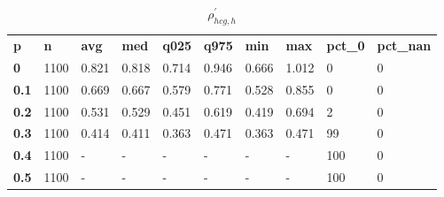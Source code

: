 \begin{table}[h]
 \centering 
\footnotesize
\caption{$\rho_{hcg,h}^\prime $}
\label{tab:alphahcgh}
\begin{tabular}[h]{| l l l l l l l l l l|
    } \hline
\textbf{ p} & \textbf{ n} & \textbf{ avg} & \textbf{ med} & \textbf{ q025} & \textbf{ q975} & \textbf{ min} & \textbf{ max} & \textbf{ pct\_0} & \textbf{ pct\_nan}
           \\
  \textbf{  0} & 1100 & 0.821 & 0.818 & 0.714 & 0.946 & 0.666 & 1.012 &   0 & 0
           \\
  \textbf{0.1} & 1100 & 0.669 & 0.667 & 0.579 & 0.771 & 0.528 & 0.855 &   0 & 0
           \\
  \textbf{0.2} & 1100 & 0.531 & 0.529 & 0.451 & 0.619 & 0.419 & 0.694 &   2 & 0
           \\
  \textbf{0.3} & 1100 & 0.414 & 0.411 & 0.363 & 0.471 & 0.363 & 0.471 &  99 & 0
           \\
  \textbf{0.4} & 1100 & - & - & - & - & - & - & 100 & 0
           \\
  \textbf{0.5} & 1100 & - & - & - & - & - & - & 100 & 0
           \\
 \hline \end{tabular}
 \end{table}
